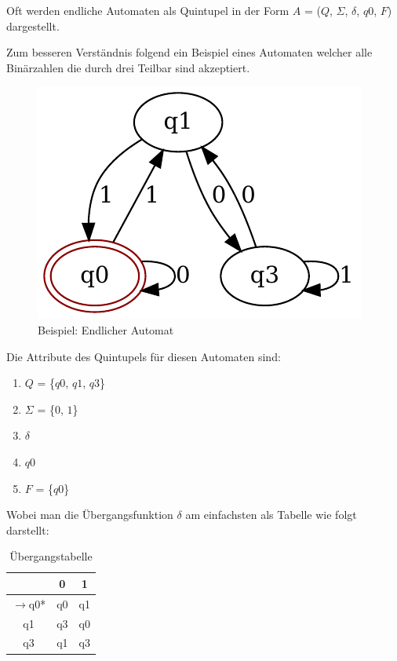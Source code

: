 Oft werden endliche Automaten als Quintupel in der Form $A$ = ($Q$, $\Sigma$, $\delta$, $q0$, $F$) dargestellt. 

Zum besseren Verständnis folgend ein Beispiel eines Automaten welcher alle Binärzahlen die durch drei Teilbar sind akzeptiert.
\begin{figure}[h]
  \centering
  \includegraphics{images/endlicher_automat.pdf}
  \caption[Beispiel: Endlicher Automat]{Beispiel: Endlicher Automat}
  \label{fig:endlicher_automat}
\end{figure}

Die Attribute des Quintupels für diesen Automaten sind:
\begin{enumerate}
	\item $Q$ = \{$q0$, $q1$, $q3$\}
	\item $\Sigma$ = \{$0$, $1$\}
	\item $\delta$
	\item $q0$
	\item $F$ = \{$q0$\}
\end{enumerate}
Wobei man die Übergangsfunktion $\delta$ am einfachsten als Tabelle wie folgt darstellt:
\begin{table}[h]
	\centering
	\begin{tabular}{ c || c | c }
	  \hline
	   & 0 & 1 \\
	  \hline  
	  $\rightarrow$q0* & q0 & q1 \\
	  q1 & q3 & q0 \\
	  q3 & q1 & q3 \\
	  \hline  
	\end{tabular}
	\caption[Übergangstabelle]{Übergangstabelle}
\end{table}

